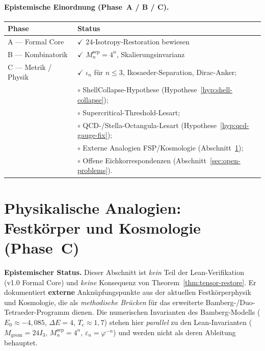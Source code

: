 \documentclass[11pt,a4paper]{article}
\begin{document}
	\paragraph{Epistemische Einordnung (Phase~A / B / C).}
	\begin{center}
		\small
		\begin{tabular}{ll}
			\hline
			\textbf{Phase} & \textbf{Status} \\
			\hline
			A --- Formal Core & $\checkmark$ 24-Isotropy-Restoration bewiesen \\
			B --- Kombinatorik & $\checkmark$ $M_n^{\mathrm{sep}}=4^n$, Skalierungsinvarianz \\
			C --- Metrik / Physik &
			$\checkmark$ $\iota_n$ für $n\le 3$, Ikosaeder-Separation, Dirac-Anker; \\
			& $\circ$ ShellCollapse-Hypothese (Hypothese~\ref{hyp:shell-collapse}); \\
			& $\circ$ Supercritical-Threshold-Lesart; \\
			& $\circ$ QCD-/Stella-Octangula-Lesart (Hypothese~\ref{hyp:qcd-gauge-fix}); \\
			& $\circ$ Externe Analogien FSP/Kosmologie (Abschnitt~\ref{sec:phase-c-bridges}); \\
			& $\circ$ Offene Eichkorrespondenzen (Abschnitt~\ref{sec:open-problems}). \\
			\hline
		\end{tabular}
	\end{center}
	
	\section{Physikalische Analogien: Festkörper und Kosmologie (Phase~C)}
	\label{sec:phase-c-bridges}
	
	\textbf{Epistemischer Status.}
	Dieser Abschnitt ist \emph{kein} Teil der Lean-Verifikation (v1.0 Formal Core)
	und \emph{keine} Konsequenz von Theorem~\ref{thm:tensor-restore}.
	Er dokumentiert \textbf{externe} Anknüpfungspunkte aus der aktuellen
	Festkörperphysik und Kosmologie, die als \emph{methodische Brücken} für das
	erweiterte Bamberg-/Duo-Tetraeder-Programm dienen.
	Die numerischen Invarianten des Bamberg-Modells
	($E_0\approx -4{,}085$, $\Delta E=4$, $T_c\approx 1{,}7$)
	stehen hier \emph{parallel} zu den Lean-Invarianten
	($M_{\mathrm{geom}}=24I_3$, $M_n^{\mathrm{sep}}=4^n$, $\varepsilon_n=\varphi^{-n}$)
	und werden nicht als deren Ableitung behauptet.
	
\end{document}

